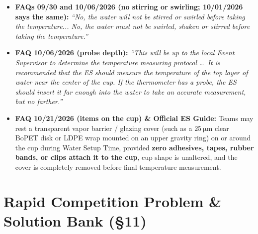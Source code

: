 \begin{rulebox}
\begin{itemize}
  \item \textbf{FAQs 09/30 and 10/06/2026 (no stirring or swirling; 10/01/2026 says the same):} \emph{``No, the water will not be stirred or swirled before taking the temperature... No, the water must not be swirled, shaken or stirred before taking the temperature.''}
  \item \textbf{FAQ 10/06/2026 (probe depth):} \emph{``This will be up to the local Event Supervisor to determine the temperature measuring protocol \ldots\ It is recommended that the ES should measure the temperature of the top layer of water near the center of the cup. If the thermometer has a probe, the ES should insert it far enough into the water to take an accurate measurement, but no farther.''}
  \item \textbf{FAQ 10/21/2026 (items on the cup) \& Official ES Guide:} Teams may rest a transparent vapor barrier / glazing cover (such as a $\SI{25}{\micro\meter}$ clear BoPET disk or LDPE wrap mounted on an upper gravity ring) on or around the cup during Water Setup Time, provided \textbf{zero adhesives, tapes, rubber bands, or clips attach it to the cup}, cup shape is unaltered, and the cover is completely removed before final temperature measurement.
\end{itemize}
\end{rulebox}

\section{Rapid Competition Problem \& Solution Bank (§11)}
\label{sec:11.6}

